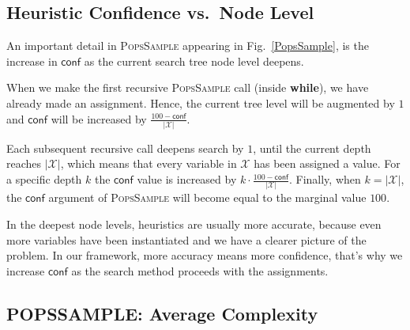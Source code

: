 \documentclass{ws-ijait}
\begin{document}
\subsection{Heuristic Confidence vs.\ Node Level}

An important detail in \textsc{PopsSample} appearing in Fig.~\ref{PopsSample}, is the increase in $\mathsf{conf}$ as the current search tree node level deepens.

When we make the first recursive \textsc{PopsSample} call (inside \textbf{while}), we have already made an assignment. Hence, the current tree level will be augmented by $1$ and $\mathsf{conf}$ will be increased by $\frac{100 - \mathsf{conf}}{|\mathscr{X}|}$.

Each subsequent recursive call deepens search by $1$, until the current depth reaches $|\mathscr{X}|$, which means that every variable in $\mathscr{X}$ has been assigned a value. For a specific depth $k$ the $\mathsf{conf}$ value is increased by $k \cdot \frac{100 - \mathsf{conf}}{|\mathscr{X}|}$. Finally, when $k = |\mathscr{X}|$, the $\mathsf{conf}$ argument of \textsc{PopsSample} will become equal to the marginal value $100$.

In the deepest node levels, heuristics are usually more accurate, because even more variables have been instantiated and we have a clearer picture of the problem. In our framework, more accuracy means more confidence, that's why we increase $\mathsf{conf}$ as the search method proceeds with the assignments.


%
%


\newcommand{\PoPS}{\textbf{\large P\normalsize O\large PS}}
\newcommand{\PopsSample}{\textbf{\large P\normalsize OPS\large S\normalsize AMPLE}}

\subsection{\PopsSample: Average Complexity}
\end{document}
